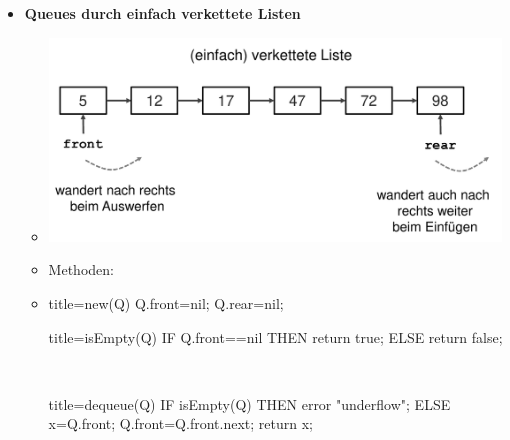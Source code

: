 \documentclass[
    12pt,
    a4paper,
    ngerman,
    color=3b,%
    marginpar=false,
    colorback=false,
    leqno,
]{tudaexercise}
\begin{document}
\begin{itemize}
          \pagebreak

    \item \textbf{Queues durch einfach verkettete Listen}
          \begin{itemize}
              \item[] \includegraphics[width=12cm]{pictures/queuesListe1.pdf}
              \item[] Methoden:
              \item[] %
                    \begin{minipage}[t]{.4\textwidth}
                        \begin{codeBlock}[autogobble]{title={new(Q)}}
                            Q.front=nil;
                            Q.rear=nil;
                        \end{codeBlock}
                    \end{minipage}
                    \begin{minipage}[t]{.4\textwidth}
                        \begin{codeBlock}[autogobble]{title={isEmpty(Q)}}
                            IF Q.front==nil THEN
                                return true;
                            ELSE
                                return false;
                        \end{codeBlock}
                    \end{minipage}
                    \\
                    \begin{minipage}[t]{.4\textwidth}
                        \begin{codeBlock}[autogobble]{title={dequeue(Q)}}
                            IF isEmpty(Q) THEN
                                error "underflow";
                            ELSE
                                x=Q.front;
                                Q.front=Q.front.next;
                                return x;
                        \end{codeBlock}

\end{minipage}
\end{itemize}
\end{itemize}
\end{document}
